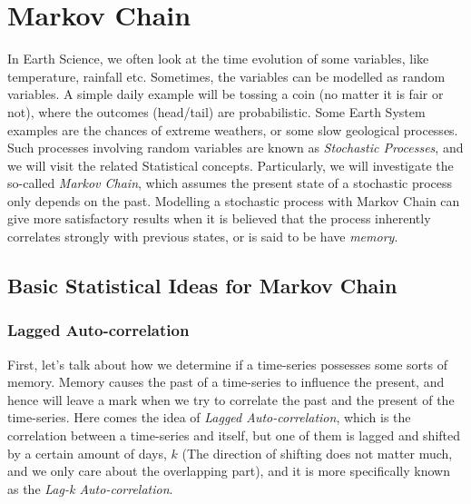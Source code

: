\chapter{Markov Chain}

In Earth Science, we often look at the time evolution of some variables, like temperature, rainfall etc. Sometimes, the variables can be modelled as random variables. A simple daily example will be tossing a coin (no matter it is fair or not), where the outcomes (head/tail) are probabilistic. Some Earth System examples are the chances of extreme weathers, or some slow geological processes. Such processes involving random variables are known as \textit{Stochastic Processes}, and we will visit the related Statistical concepts. Particularly, we will investigate the so-called \textit{Markov Chain}, which assumes the present state of a stochastic process only depends on the past. Modelling a stochastic process with Markov Chain can give more satisfactory results when it is believed that the process inherently correlates strongly with previous states, or is said to be have \textit{memory}.

\section{Basic Statistical Ideas for Markov Chain}

\subsection{Lagged Auto-correlation}

First, let's talk about how we determine if a time-series possesses some sorts of memory. Memory causes the past of a time-series to influence the present, and hence will leave a mark when we try to correlate the past and the present of the time-series. Here comes the idea of \textit{Lagged Auto-correlation}, which is the correlation between a time-series and itself, but one of them is lagged and shifted by a certain amount of days, $k$ (The direction of shifting does not matter much, and we only care about the overlapping part), and it is more specifically known as the \textit{Lag-k Auto-correlation}.

